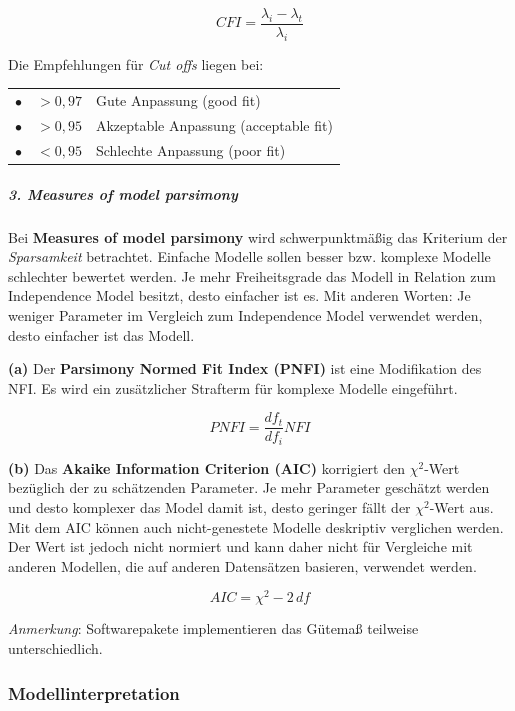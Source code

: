 \documentclass{article}
\numberwithin{equation}{section}
\begin{document}
\begin{equation}
CFI = \frac{\lambda_i - \lambda_t}{\lambda_i}
\end{equation}

Die Empfehlungen für \emph{Cut offs} liegen bei:

\begin{tabular}{lll}
$\bullet$ & $> 0,97$ & Gute Anpassung (good fit)\\
$\bullet$ & $> 0,95$ & Akzeptable Anpassung (acceptable fit)\\
$\bullet$ & $< 0,95$ & Schlechte Anpassung (poor fit)
\end{tabular}

\subparagraph*{3. Measures of model parsimony}

Bei \textbf{Measures of model parsimony} wird schwerpunktmäßig das Kriterium der \emph{Sparsamkeit} betrachtet. Einfache Modelle sollen besser bzw. komplexe Modelle schlechter bewertet werden. Je mehr Freiheitsgrade das Modell in Relation zum Independence Model besitzt, desto einfacher ist es. Mit anderen Worten: Je weniger Parameter im Vergleich zum Independence Model verwendet werden, desto einfacher ist das Modell.

\textbf{(a)} Der \textbf{Parsimony Normed Fit Index (PNFI)} ist eine Modifikation des NFI. Es wird ein zusätzlicher Strafterm für komplexe Modelle eingeführt.

\begin{equation}
PNFI = \frac{df_t}{df_i} NFI
\end{equation}

\textbf{(b)} Das \textbf{Akaike Information Criterion (AIC)} korrigiert den $\chi^2$-Wert bezüglich der zu schätzenden Parameter. Je mehr Parameter geschätzt werden und desto komplexer das Model damit ist, desto geringer fällt der $\chi^2$-Wert aus. Mit dem AIC können auch nicht-genestete Modelle deskriptiv verglichen werden. Der Wert ist jedoch nicht normiert und kann daher nicht für Vergleiche mit anderen Modellen, die auf anderen Datensätzen basieren, verwendet werden. 

\begin{equation}
AIC = \chi^2 - 2\,df
\end{equation}

\emph{Anmerkung}: Softwarepakete implementieren das Gütemaß teilweise unterschiedlich.

\subsubsection{Modellinterpretation}
\end{document}
